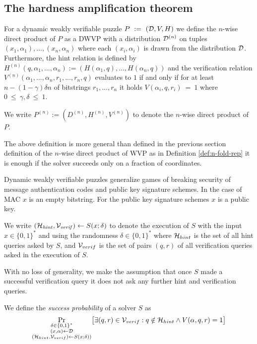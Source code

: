 \subsection{The hardness amplification theorem}
\begin{definition}
  \label{def:n-wdp-dwvp}
For a dynamic weakly verifiable puzzle $P~:=~(\mathcal{D}, V, H)$ we define the $n$-wise direct product of $P$
as a DWVP with a distribution $\mathcal{D}^{(n)}$ on tuples $(x_1, \alpha_1), \dotsc, (x_n, \alpha_n)$ where
each $(x_i, \alpha_i)$ is drawn from the distribution $\mathcal{D}$.
Furthermore, the hint relation is defined by $H^{(n)}(q, \alpha_1, \dotsc, \alpha_n) := (H(\alpha_1, q), \dotsc, H(\alpha_n, q))$ and
the verification relation $V^{(n)}(\alpha_1, \dotsc, \alpha_n, r_1, \dotsc, r_n, q)$ evaluates to $1$ if and only if
for at least $n - (1 - \gamma)\delta n$ of bitstrings $r_1, \dotsc, r_n $ it holds $V(\alpha_i, q, r_i)~=~1$ where $0~\leq~\gamma,\delta~\leq~1$.
%
\end{definition}
We write $P^{(n)} := (D^{(n)}, H^{(n)}, V^{(n)})$ to denote the $n$-wise direct product of $P$.

The above definition is more general than defined in the previous section definition of the $n$-wise direct product of WVP as
in Definition \ref{def:n-fold-rep} it is enough if the solver succeeds only on a fraction of coordinates.

Dynamic weakly verifiable puzzles generalize games of breaking security of message authentication codes and public key signature schemes.
In the case of MAC $x$ is an empty bitstring. For the public key signature schemes $x$ is a public key.

We write $(\mathcal{H}_{\mathit{hint}}, \mathcal{V}_{\mathit{verif}}) \leftarrow S(x; \delta)$ to denote
the execution of $S$ with the input $x \in \{0,1\}^{*}$ and using the randomness $\delta \in \{0,1\}^{*}$
where $\mathcal{H}_{hint}$ is the set of all hint queries asked by $S$, and $\mathcal{V}_{verif}$ is
the set of pairs $(q,r)$ of all verification queries asked in the execution of $S$.

With no loss of generality, we make the assumption that once $S$
made a successful verification query it does not ask any further hint and verification queries.

We define the \textit{success probability} of a solver $S$ as
\begin{align*}
  \underset{\substack{\delta \in \{0,1\}^{*} \\(x,\alpha) \leftarrow \mathcal{D} \\ (\mathcal{H}_{hint}, \mathcal{V}_{verif}) \leftarrow S(x;\delta))}}
  {\Pr}\big[\exists (q,r) \in \mathcal{V}_{verif} : q \notin \mathcal{H}_{hint} \land V(\alpha, q, r) = 1 \big]
\end{align*}

